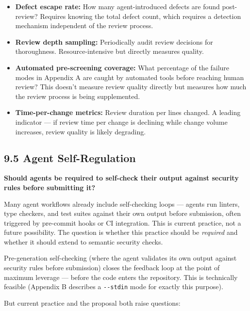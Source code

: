 \documentclass[a4paper,11pt]{report}
\providecommand{\tightlist}{%
  \setlength{\itemsep}{0pt}\setlength{\parskip}{0pt}}
\begin{document}
\begin{itemize}
\tightlist
\item
  \textbf{Defect escape rate:} How many agent-introduced defects are
  found post-review? Requires knowing the total defect count, which
  requires a detection mechanism independent of the review process.
\item
  \textbf{Review depth sampling:} Periodically audit review decisions
  for thoroughness. Resource-intensive but directly measures quality.
\item
  \textbf{Automated pre-screening coverage:} What percentage of the
  failure modes in Appendix A are caught by automated tools before
  reaching human review? This doesn't measure review quality directly
  but measures how much the review process is being supplemented.
\item
  \textbf{Time-per-change metrics:} Review duration per lines changed. A
  leading indicator --- if review time per change is declining while
  change volume increases, review quality is likely degrading.
\end{itemize}

\hypertarget{agent-self-regulation}{%
\subsection{9.5 Agent Self-Regulation}\label{agent-self-regulation}}

\textbf{Should agents be required to self-check their output against
security rules before submitting it?}

Many agent workflows already include self-checking loops --- agents run
linters, type checkers, and test suites against their own output before
submission, often triggered by pre-commit hooks or CI integration. This
is current practice, not a future possibility. The question is whether
this practice should be \emph{required} and whether it should extend to
semantic security checks.

Pre-generation self-checking (where the agent validates its own output
against security rules before submission) closes the feedback loop at
the point of maximum leverage --- before the code enters the repository.
This is technically feasible (Appendix B describes a \texttt{-\/-stdin}
mode for exactly this purpose).

But current practice and the proposal both raise questions:
\end{document}
